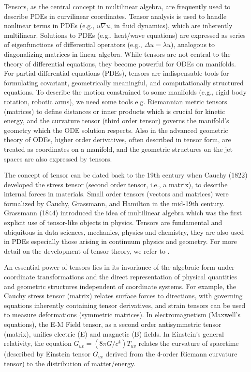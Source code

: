 \documentclass[11pt, oneside]{article}  %
\newcommand{\la}{\lambda}
\begin{document}
Tensors, as the central concept in multilinear algebra, are frequently used to describe PDEs in curvilinear coordinates. Tensor analysis is used 
to handle nonlinear terms in PDEs (e.g., $u\nabla u$, in fluid dynamics), which are inherently multilinear.  Solutions to PDEs (e.g., heat/wave equations) are expressed as series of eigenfunctions of differential operators (e.g., $\Delta u=\la u$), analogous to diagonalizing matrices in 
linear algebra.  While tensors are not central to the theory of differential equations, they become powerful for ODEs on manifolds. For partial 
differential equations (PDEs), tensors are indispensable tools for formulating covariant, geometrically meaningful, and computationally 
structured equations. To describe the motion constrained to some manifolds (e.g., rigid body rotation, robotic arms), we need some tools e.g. Riemannian metric tensors (matrices) 
to define distances or inner products which is crucial for kinetic energy, and the curvature tensor (third order tensor) governs the manifold's 
geometry which the ODE solution respects.  Also in the advanced geometric theory of ODEs, higher order derivatives, often described in tensor 
form, are treated as coordinates on a manifold, and the geometric structures on the jet spaces are also expressed by tensors. 

The concept of tensor can be dated back to the 19th century when Cauchy (1822) developed the stress tensor (second order tensor, i.e., a matrix), 
to describe internal forces in materials. Small order tensors (vectors and matrices) were formalized by Cauchy, Grassmann, and Hamilton in the 
mid-19th century. Grassmann (1844) introduced the idea of multilinear algebra which was the first explicit use of tensor-like objects in physics. 
Tensors are fundamental and ubiquitous in data sciences, mechanics, physics and chemistry, they are also used in PDEs especially those arising in continuum physics and geometry. For more detail on the development of tensor theory, we refer to \cite{QCC2018}.   

An essential power of tensors lies in its invariance of the algebraic form under coordinate transformations and the direct representation of 
physical quantities and geometric structures independent of coordinate systems.  For example, the Cauchy stress tensor (matrix) relates surface 
forces to directions, with governing equations inherently containing tensor derivatives, and strain tensors can be used to measure deformations 
(symmetric matrices).  In electromagnetism (Maxwell's equations), the E-M Field tensor, as a second order antisymmetric tensor (matrix), unifies 
electric (E) and magnetic (B) fields. In Einstein's general relativity, the equation $G_{uv}= (8\pi G/c^{4})T_{uv}$ relates the curvature of 
spacetime (described by Einstein tensor $G_{uv}$ derived from the 4-order Riemann curvature tensor) to the distribution of matter/energy. 
\end{document}
